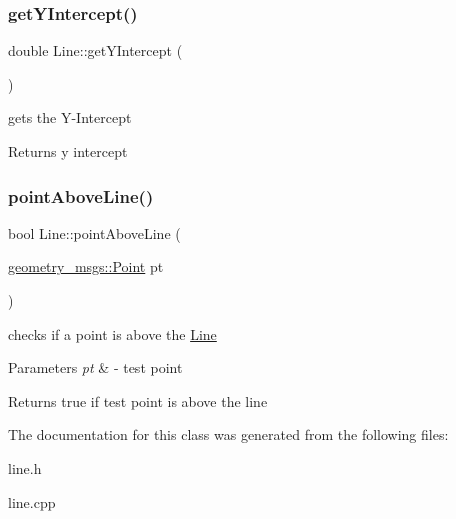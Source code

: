 \subsubsection{\texorpdfstring{get\+Y\+Intercept()}{getYIntercept()}}
{\footnotesize\ttfamily double Line\+::get\+Y\+Intercept (\begin{DoxyParamCaption}{ }\end{DoxyParamCaption})}



gets the Y-\/\+Intercept 

\begin{DoxyReturn}{Returns}
y intercept 
\end{DoxyReturn}
\mbox{\label{classLine_a058bf81f941f204ec351925660c296b3}} 
\subsubsection{\texorpdfstring{point\+Above\+Line()}{pointAboveLine()}}
{\footnotesize\ttfamily bool Line\+::point\+Above\+Line (\begin{DoxyParamCaption}\item[{\hyperlink{structgeometry__msgs_1_1Point}{geometry\+\_\+msgs\+::\+Point}}]{pt }\end{DoxyParamCaption})}



checks if a point is above the \hyperlink{classLine}{Line} 


\begin{DoxyParams}{Parameters}
{\em pt} & -\/ test point \\
\hline
\end{DoxyParams}
\begin{DoxyReturn}{Returns}
true if test point is above the line 
\end{DoxyReturn}


The documentation for this class was generated from the following files\+:\begin{DoxyCompactItemize}
\item 
line.\+h\item 
line.\+cpp\end{DoxyCompactItemize}
